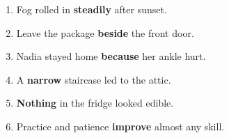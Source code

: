 \documentclass[11pt]{article}
\begin{document}
\begin{enumerate}
  \item Fog rolled in \textbf{steadily} after sunset. \underline{\hspace{1.4in}}
  \item Leave the package \textbf{beside} the front door. \underline{\hspace{1.4in}}
  \item Nadia stayed home \textbf{because} her ankle hurt. \underline{\hspace{1.4in}}
  \item A \textbf{narrow} staircase led to the attic. \underline{\hspace{1.4in}}
  \item \textbf{Nothing} in the fridge looked edible. \underline{\hspace{1.4in}}
  \item Practice and patience \textbf{improve} almost any skill. \underline{\hspace{1.4in}}
\end{enumerate}

\newpage
\end{document}
